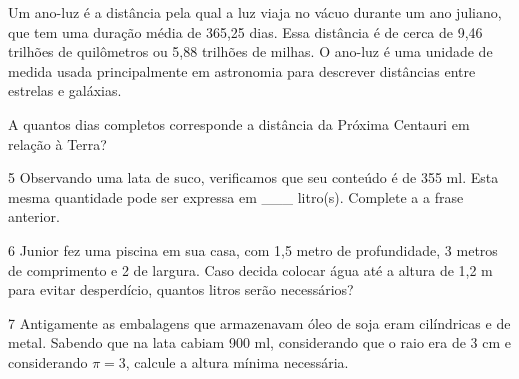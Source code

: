 Um ano-luz é a distância pela qual a luz viaja no vácuo durante um ano
juliano, que tem uma duração média de 365,25 dias. Essa distância é de
cerca de 9,46 trilhões de quilômetros ou 5,88 trilhões de milhas. O
ano-luz é uma unidade de medida usada principalmente em astronomia para
descrever distâncias entre estrelas e galáxias.

A quantos dias completos corresponde a distância da Próxima Centauri em relação à Terra?

\begin{emptybox}
\end{emptybox}

\num{5} Observando uma lata de suco, verificamos que seu conteúdo é de 355
ml. Esta mesma quantidade pode ser expressa em \_\_\_ litro(s). Complete
a a frase anterior.

\begin{emptybox}
\end{emptybox}

\num{6} Junior fez uma piscina em sua casa, com 1,5 metro
de profundidade, 3 metros de comprimento e 2 de largura. Caso decida
colocar água até a altura de 1,2 m para evitar desperdício,
quantos litros serão necessários?

\begin{emptybox}
\end{emptybox}

\pagebreak
\num{7} Antigamente as embalagens que armazenavam óleo de soja eram
cilíndricas e de metal. Sabendo que na lata cabiam 900 ml, considerando
que o raio era de 3 cm e considerando $\pi = 3$, calcule a altura
mínima necessária.

\begin{emptybox}
\end{emptybox}


